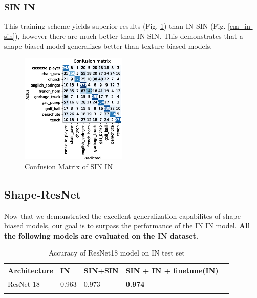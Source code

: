 \documentclass{article}
\begin{document}
\subsubsection{SIN \texorpdfstring{\textrightarrow} .IN}

This training scheme yields superior results (Fig. \ref{cm_sin-in}) than IN \texorpdfstring{\textrightarrow} .SIN (Fig. \ref{cm_in-sin}), however
there are much better than IN \texorpdfstring{\textrightarrow} .SIN.
This demonstrates that a shape-biased model generalizes better than texture biased models.

\begin{figure}[h!]
  \includegraphics[width = 0.45\textwidth]{imgs/sin/sin-in/sin-in_confusion_matrix_0.624.eps}
  \caption{Confusion Matrix of SIN \texorpdfstring{\textrightarrow} .IN}
  \label{cm_sin-in}
\end{figure}

\subsection{Shape-ResNet}

Now that we demonstrated the excellent generalization capabilites of shape biased models,
our goal is to surpass the performance of the IN \texorpdfstring{\textrightarrow} .IN model.
\textbf{All the following models are evaluated on the IN dataset.}

\begin{table}[h!]
  \begin{tabular}{lllll}
  \Xhline{2\arrayrulewidth}
  Architecture & IN & SIN+SIN  & SIN + IN + finetune(IN) \\ \hline
  ResNet-18    & 0.963    & 0.973   & \textbf{0.974}    \\ \Xhline{2\arrayrulewidth}
  \end{tabular}
  \caption{Accuracy of ResNet18 model on IN test set}
\end{table}
\end{document}
